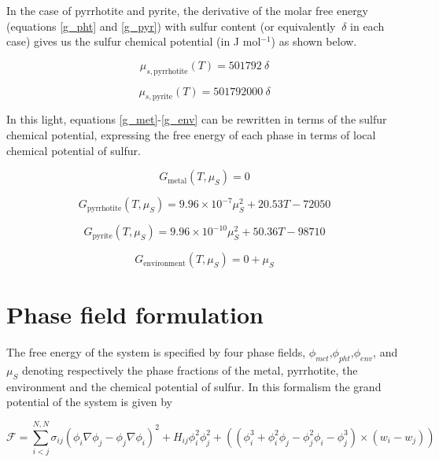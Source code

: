 \documentclass{article}
\begin{document}
In the case of pyrrhotite and pyrite, the derivative of the molar free energy (equations \ref{g_pht} and \ref{g_pyr}) with sulfur content (or equivalently $\ \delta$ in each case) gives us the sulfur chemical potential (in J mol$^{-1}$) as shown below.

\begin{equation}
  \mu_{s,\mathrm{pyrrhotite}}(T) = 501792 \ \delta
\end{equation}

\begin{equation}
  \mu_{s,\mathrm{pyrite}}(T) = 501792000 \ \delta
\end{equation}


In this light, equations \ref{g_met}-\ref{g_env} can be rewritten in terms of the sulfur chemical potential, expressing the free energy of each phase in terms of local chemical potential of sulfur.



\begin{equation}
  G_{\mathrm{metal}}(T,\mu_S) = 0
\label{gmu_met}
\end{equation}

\begin{equation}
  G_{\mathrm{pyrrhotite}}(T,\mu_S) = 9.96\times10^{-7} \mu_S^2 + 20.53T - 72050
\label{gmu_pht}
\end{equation}

\begin{equation}
  G_{\mathrm{pyrite}}(T,\mu_S) = 9.96\times10^{-10} \mu_S^2 + 50.36T - 98710
\label{gmu_pyr}
\end{equation}

\begin{equation}
  G_{\mathrm{environment}}(T,\mu_S) = 0 + \mu_S
\label{gmu_env}
\end{equation}



\section{Phase field formulation}

The free energy of the system is specified by four phase fields, $\phi_{met}$,$\phi_{pht}$,$\phi_{env}$, and $\mu_{S}$ denoting respectively the phase fractions of the metal, pyrrhotite, the environment and the chemical potential of sulfur. In this formalism the grand potential of the system is given by

\begin{equation}
  \mathcal{F} = \sum\limits_{i<j}^{N,N} \sigma_{ij}(\phi_i\nabla\phi_j-\phi_j\nabla\phi_i)^2 + H_{ij}\phi_i^2\phi_j^2 + ((\phi_i^3+\phi_i^2\phi_j-\phi_j^2\phi_i-\phi_j^3)\times(w_i-w_j))
\label{eq:gr_pot}
\end{equation}
\end{document}
